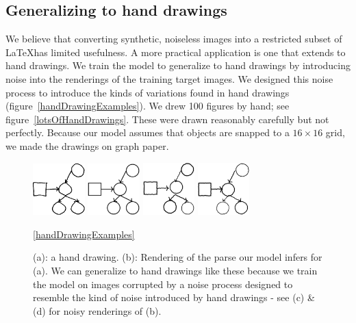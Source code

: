\documentclass{article}
\begin{document}
\subsection{Generalizing to hand drawings}
We believe that converting synthetic, noiseless images into a restricted subset of
\LaTeX has limited usefulness.  A more practical
application is one that extends to hand drawings.  We train the model
to generalize to hand drawings by introducing noise into the
renderings of the training target images.
We designed this noise process to introduce the kinds of variations found in hand drawings (figure~\ref{handDrawingExamples}).
We drew 100 figures by hand; see figure~\ref{lotsOfHandDrawings}.
These were drawn reasonably carefully but not perfectly.
Because our model assumes that objects are snapped to a $16\times 16$ grid,
we made the drawings on graph paper.
\begin{figure}[H]%
  \begin{minipage}[t]{0.2\textwidth}\includegraphics[width = 2cm]{figures/expert-60-reduced.png}
    \subcaption{}
  \end{minipage}%
   \begin{minipage}[t]{0.2\textwidth}\includegraphics[width = 2cm]{figures/60-groundTruth-reduced.png}
    \subcaption{}
  \end{minipage}%
  \begin{minipage}[t]{0.2\textwidth}\includegraphics[width = 2cm]{figures/60-1-reduced.png}
    \subcaption{}
  \end{minipage}%
  \begin{minipage}[t]{0.2\textwidth}\includegraphics[width = 2cm]{figures/60-2-reduced.png} 
    \subcaption{}
  \end{minipage}
  \caption{(a): a hand drawing. (b): Rendering of the parse our model infers for (a). We can generalize to hand drawings like these because we train the model on images corrupted by a noise process designed to resemble the kind of noise introduced by hand drawings - see (c) \& (d) for noisy renderings of (b).}\ref{handDrawingExamples}
\end{figure}
\end{document}
